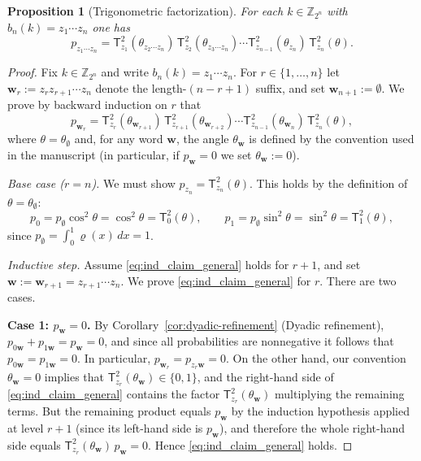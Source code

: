 \documentclass{article}
\newtheorem{proposition}[theorem]{Proposition}
\numberwithin{equation}{section}
\begin{document}
\begin{proposition}[Trigonometric factorization]\label{prop:trig_factorization}
For each $k\in\mathbb{Z}_{2^n}$ with $b_n(k)=z_1\cdots z_n$ one has
\begin{equation}\label{eq:factorization}
p_{z_1\cdots z_n}
=
\mathsf{T}_{z_1}^2(\theta_{z_2\cdots z_n})\,
\mathsf{T}_{z_2}^2(\theta_{z_3\cdots z_n})\cdots
\mathsf{T}_{z_{n-1}}^2(\theta_{z_n})\,
\mathsf{T}_{z_n}^2(\theta).
\end{equation}
\end{proposition}

\begin{proof}
Fix $k\in\mathbb{Z}_{2^n}$ and write $b_n(k)=z_1\cdots z_n$.
For $r\in\{1,\dots,n\}$ let $\mathbf{w}_r:=z_r z_{r+1}\cdots z_n$ denote the length-$(n-r+1)$ suffix,
and set $\mathbf{w}_{n+1}:=\emptyset$. We prove by backward induction on $r$ that
\begin{equation}\label{eq:ind_claim_general}
p_{\mathbf{w}_r}
=
\mathsf{T}_{z_r}^2(\theta_{\mathbf{w}_{r+1}})\,
\mathsf{T}_{z_{r+1}}^2(\theta_{\mathbf{w}_{r+2}})\cdots
\mathsf{T}_{z_{n-1}}^2(\theta_{\mathbf{w}_n})\,
\mathsf{T}_{z_n}^2(\theta),
\end{equation}
where $\theta=\theta_{\emptyset}$ and, for any word $\mathbf{w}$, the angle $\theta_{\mathbf{w}}$ is defined by the convention
used in the manuscript (in particular, if $p_{\mathbf{w}}=0$ we set $\theta_{\mathbf{w}}:=0$).

\emph{Base case ($r=n$).}
We must show $p_{z_n}=\mathsf{T}_{z_n}^2(\theta)$. This holds by the definition of $\theta=\theta_{\emptyset}$:
\[
p_0=p_{\emptyset}\cos^2\theta=\cos^2\theta=\mathsf{T}_0^2(\theta),\qquad
p_1=p_{\emptyset}\sin^2\theta=\sin^2\theta=\mathsf{T}_1^2(\theta),
\]
since $p_{\emptyset}=\int_0^1\varrho(x)\,dx=1$.

\emph{Inductive step.}
Assume \eqref{eq:ind_claim_general} holds for $r+1$, and set $\mathbf{w}:=\mathbf{w}_{r+1}=z_{r+1}\cdots z_n$.
We prove \eqref{eq:ind_claim_general} for $r$. There are two cases.

\smallskip
\noindent\textbf{Case 1: $p_{\mathbf{w}}=0$.}
By Corollary~\ref{cor:dyadic-refinement} (Dyadic refinement), $p_{0\mathbf{w}}+p_{1\mathbf{w}}=p_{\mathbf{w}}=0$, and since
all probabilities are nonnegative it follows that $p_{0\mathbf{w}}=p_{1\mathbf{w}}=0$. In particular,
$p_{\mathbf{w}_r}=p_{z_r \mathbf{w}}=0$. On the other hand, our convention $\theta_{\mathbf{w}}=0$ implies that
$\mathsf{T}_{z_r}^2(\theta_{\mathbf{w}})\in\{0,1\}$, and the right-hand side of \eqref{eq:ind_claim_general} contains
the factor $\mathsf{T}_{z_r}^2(\theta_{\mathbf{w}})$ multiplying the remaining terms. But the remaining product
equals $p_{\mathbf{w}}$ by the induction hypothesis applied at level $r+1$ (since its left-hand side is $p_{\mathbf{w}}$),
and therefore the whole right-hand side equals $\mathsf{T}_{z_r}^2(\theta_{\mathbf{w}})\,p_{\mathbf{w}}=0$.
Hence \eqref{eq:ind_claim_general} holds.


\end{proof}
\end{document}
